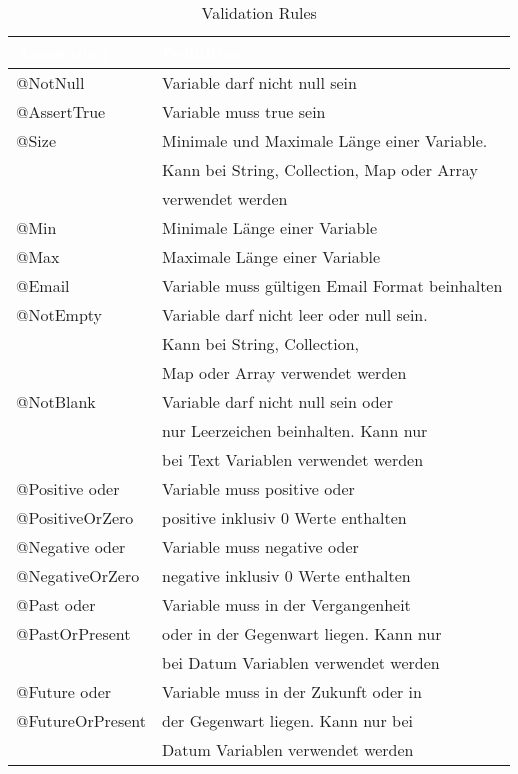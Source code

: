 \begin{table}[H]
\begin{center}
  \begin{tabular}{| l | l |}

\hline
\rowcolor{Gray}
\textcolor{white}{\textbf{Annotation}} & \textcolor{white}{\textbf{Definition}} \\

\hline
\rowcolor{LGray}
@NotNull						& Variable darf nicht null sein						\\
\hline
@AssertTrue						& Variable muss true sein 	\\
\hline
\rowcolor{LGray}
@Size							& Minimale und Maximale Länge einer Variable. \\
\rowcolor{LGray}				& Kann bei String, Collection, Map oder Array \\
\rowcolor{LGray}				& verwendet werden \\
\hline
@Min							& Minimale Länge einer Variable	\\
\hline
\rowcolor{LGray}
@Max							& Maximale Länge einer Variable \\
\hline
@Email							& Variable muss gültigen Email Format beinhalten \\
\hline
\rowcolor{LGray}
@NotEmpty						& Variable darf nicht leer oder null sein. \\
\rowcolor{LGray}				& Kann bei String, Collection, \\
\rowcolor{LGray}				& Map oder Array verwendet werden \\
\hline
@NotBlank						& Variable darf nicht null sein oder \\
								& nur Leerzeichen beinhalten. Kann nur \\
								& bei Text Variablen verwendet werden 	\\
\hline
\rowcolor{LGray}
@Positive oder 					& Variable muss positive oder \\
\rowcolor{LGray}@PositiveOrZero	& positive inklusiv 0 Werte enthalten\\
\hline
@Negative oder 					& Variable muss negative oder \\
@NegativeOrZero					& negative inklusiv 0 Werte enthalten\\
\hline
\rowcolor{LGray}
@Past oder 						& Variable muss in der Vergangenheit \\
\rowcolor{LGray}@PastOrPresent	& oder in der Gegenwart liegen. Kann nur \\
\rowcolor{LGray}				& bei Datum Variablen verwendet werden 	\\
\hline
@Future oder 					& Variable muss in der Zukunft oder in \\
@FutureOrPresent				& der Gegenwart liegen. Kann nur bei \\
								&Datum Variablen verwendet werden \\
\hline

\end{tabular}
  \end{center}
\caption[Validation Rules]{Validation Rules}
\label{tab:lastenheft}
\end{table}

